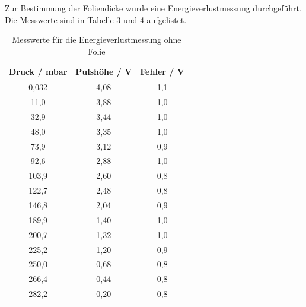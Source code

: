 \documentclass{article}
\begin{document}
Zur Bestimmung der Foliendicke wurde eine Energieverlustmessung durchgeführt.
Die Messwerte sind in Tabelle 3 und 4 aufgelistet. 
\begin{table}[H] 
	\centering
	\begin{tabular}{c|c|c}
		
		Druck  / mbar& Pulshöhe / V& Fehler / V \\ 
		\hline 
		0,032& 4,08& 1,1\\
		11,0&3,88 & 1,0\\
		32,9& 3,44 &1,0\\
		48,0&3,35& 1,0 \\
		73,9&3,12& 0,9\\
		92,6& 2,88& 1,0\\
		103,9&2,60&0,8\\
		122,7&2,48& 0,8\\
		146,8& 2,04& 0,9\\
		189,9 & 1,40&1,0\\
		200,7&1,32&1,0\\
		225,2&1,20&0,9\\
		250,0& 0,68&0,8\\
		266,4&0,44&0,8\\
		282,2&0,20&0,8\\
		
		
	\end{tabular} 
	\caption{Messwerte für die Energieverlustmessung ohne Folie } 
\end{table}  
\end{document}

